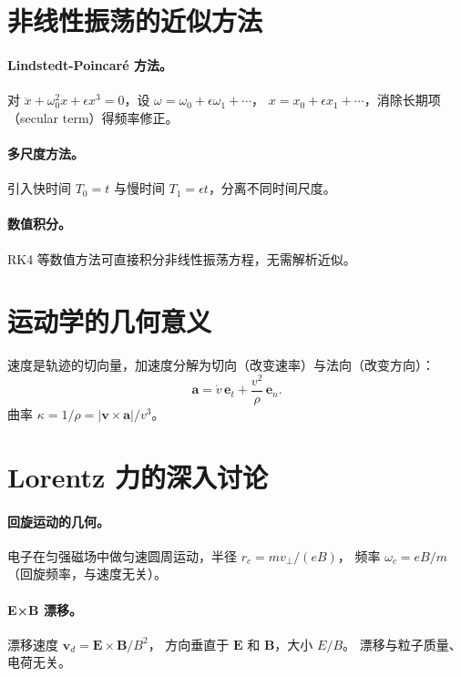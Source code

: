 \documentclass[UTF8,a4paper,11pt]{ctexart}
\begin{document}
\section{非线性振荡的近似方法}
\label{sec:nonlinear-methods}

\paragraph{Lindstedt-Poincaré 方法。}
对 $\ddot x+\omega_0^2 x+\epsilon x^3=0$，设 $\omega=\omega_0+\epsilon\omega_1+\cdots$，
$x=x_0+\epsilon x_1+\cdots$，消除长期项（secular term）得频率修正。

\paragraph{多尺度方法。}
引入快时间 $T_0=t$ 与慢时间 $T_1=\epsilon t$，分离不同时间尺度。

\paragraph{数值积分。}
RK4 等数值方法可直接积分非线性振荡方程，无需解析近似。

\section{运动学的几何意义}
\label{sec:kinematics-geometry}

速度是轨迹的切向量，加速度分解为切向（改变速率）与法向（改变方向）：
\begin{equation}
  \boldsymbol a = \dot v\,\boldsymbol e_t + \frac{v^2}{\rho}\,\boldsymbol e_n.
\end{equation}
曲率 $\kappa=1/\rho=|\boldsymbol v\times\boldsymbol a|/v^3$。

\section{Lorentz 力的深入讨论}
\label{sec:lorentz-deep}

\paragraph{回旋运动的几何。}
电子在匀强磁场中做匀速圆周运动，半径 $r_c=mv_\perp/(eB)$，
频率 $\omega_c=eB/m$（回旋频率，与速度无关）。

\paragraph{E×B 漂移。}
漂移速度 $\boldsymbol v_d=\boldsymbol E\times\boldsymbol B/B^2$，
方向垂直于 $\boldsymbol E$ 和 $\boldsymbol B$，大小 $E/B$。
漂移与粒子质量、电荷无关。
\end{document}
